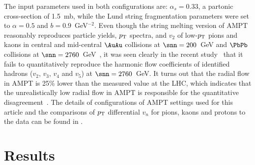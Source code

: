 The input parameters used in both configurations are: $\alpha_s = 0.33$, a partonic cross-section of 1.5~mb, while the Lund string fragmentation parameters were set to $\alpha = 0.5$ and $b = 0.9$~GeV$^{-2}$. 
Even though the string melting version of AMPT~\cite{Lin:2001zk,Lin:2004en} reasonably reproduces particle yields, $p_{\rm T}$ spectra, and $v_2$ of low-$p_{\rm T}$ pions and kaons in central and mid-central $\AuAu$ collisions at $\snn=200$~GeV and $\PbPb$ collisions at $\snn=2760$~GeV~\cite{Lin:2014tya}, it was seen clearly in the recent study~\cite{Adam:2016nfo} that it fails to quantitatively reproduce the harmonic flow coefficients of identified hadrons ($v_2$, $v_3$, $v_4$ and $v_5$) at $\snn=2760$~GeV. It turns out that the radial flow in AMPT is 25\% lower than the measured value at the LHC, which indicates that the unrealistically low radial flow in AMPT is responsible for the quantitative disagreement~\cite{Adam:2016nfo}. The details of configurations of AMPT settings used for this article and the comparisons of $p_{\rm T}$ differential $v_{n}$ for pions, kaons and protons to the data can be found in \cite{Adam:2016nfo}.


% 

\section{Results}
\label{sec:results}


